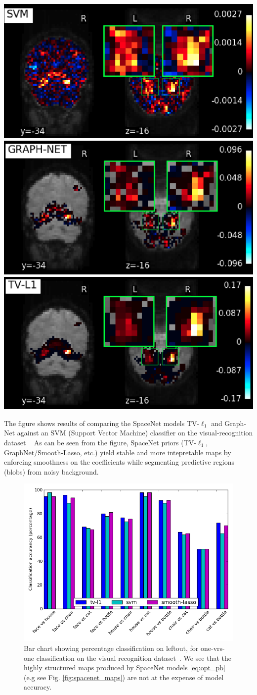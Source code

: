 \begin{pagefigure}%
  \includegraphics[width=.32\linewidth]{figures/svm.png}
  \includegraphics[width=.32\linewidth]{figures/graphnet.png}
  \includegraphics[width=.32\linewidth]{figures/tvl1.png}  
  \caption{The figure shows results of comparing the SpaceNet  models TV-$\ell_1$ and
    Graph-Net against an SVM (Support Vector Machine) classifier on
    the visual-recognition dataset  ~\citep{haxby2001}
    As can be seen from the figure, SpaceNet priors (TV-$\ell_1$, GraphNet/Smooth-Lasso, etc.)
    yield stable and more intepretable maps by enforcing smoothness on the coefficients while segmenting predictive regions (blobs) from noisy background.}
  \label{fig:spacenet_maps}
\end{pagefigure}
\begin{figure}[!htbp]
  \includegraphics[width=1\linewidth]{figures/haxby_barchart.png}
  \caption{Bar chart showing percentage classification on leftout, for one-vrs-one classification on the visual recognition dataset~\citep{haxby2001}. We see that the highly structured maps produced by SpaceNet models \eqref{eq:opt_pb} (e.g see Fig. \ref{fig:spacenet_maps}) are not at the expense of
model accuracy.}
  \label{fig:spacenet_bars}
\end{figure}


